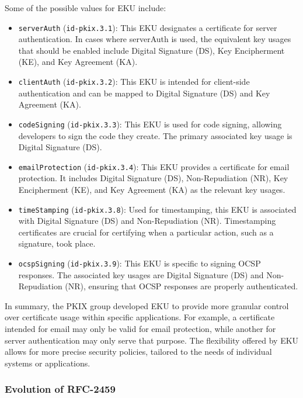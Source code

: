 Some of the possible values for EKU include:
\begin{itemize}
    \item \texttt{serverAuth} (\texttt{id-pkix.3.1}): This EKU 
    designates a certificate for server authentication. In cases 
    where serverAuth is used, the equivalent key usages that should 
    be enabled include Digital Signature (DS), Key Encipherment (KE), 
    and Key Agreement (KA).
    \item \texttt{clientAuth} (\texttt{id-pkix.3.2}): This EKU is 
    intended for client-side authentication and can be mapped to 
    Digital Signature (DS) and Key Agreement (KA).
    \item \texttt{codeSigning} (\texttt{id-pkix.3.3}): This EKU is 
    used for code signing, allowing developers to sign the code they 
    create. The primary associated key usage is Digital Signature 
    (DS).
    \item \texttt{emailProtection} (\texttt{id-pkix.3.4}): This EKU 
    provides a certificate for email protection. It includes Digital 
    Signature (DS), Non-Repudiation (NR), Key Encipherment (KE), and 
    Key Agreement (KA) as the relevant key usages.
    \item \texttt{timeStamping} (\texttt{id-pkix.3.8}): Used for 
    timestamping, this EKU is associated with Digital Signature (DS) 
    and Non-Repudiation (NR). Timestamping certificates are crucial 
    for certifying when a particular action, such as a signature, 
    took place.
    \item \texttt{ocspSigning} (\texttt{id-pkix.3.9}): This EKU is 
    specific to signing OCSP responses. The associated key usages 
    are Digital Signature (DS) and Non-Repudiation (NR), ensuring 
    that OCSP responses are properly authenticated.
\end{itemize}

In summary, the PKIX group developed EKU to provide more granular 
control over certificate usage within specific applications. For 
example, a certificate intended for email may only be valid for email 
protection, while another for server authentication may only serve 
that purpose. The flexibility offered by EKU allows for more precise 
security policies, tailored to the needs of individual systems or 
applications.

\subsubsection{Evolution of RFC-2459}

